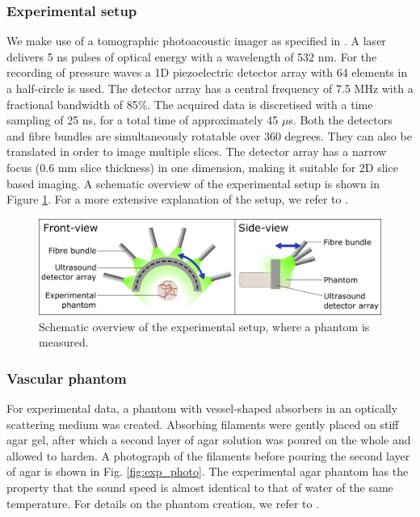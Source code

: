 \documentclass[journal]{IEEEtran}
\newcommand{\hl}[1]{#1}
\begin{document}
\subsubsection{Experimental setup}
We make use of a tomographic photoacoustic imager as specified in \cite{Es2015}. A laser delivers 5 ns pulses of optical energy with a wavelength of 532 nm. For the recording of pressure waves a 1D piezoelectric detector array with 64 elements in a half-circle is used. The detector array has a central frequency of 7.5 MHz with a fractional bandwidth of 85\%. \hl{The acquired data is discretised with a time sampling of 25 ns, for a total time of approximately 45 $\mu$s.} Both the detectors and fibre bundles are simultaneously rotatable over 360 degrees. They can also be translated in order to image multiple slices. The detector array has a narrow focus (0.6 mm slice thickness) in one dimension, making it suitable for 2D slice based imaging. A schematic overview of the experimental setup is shown in Figure \ref{fig:exp_setup}. For a more extensive explanation of the setup, we refer to \cite{Es2015}. 

\begin{figure}[!ht]
\centering
\includegraphics[width=\linewidth]{images/Experimental_setup4.png}
\caption{Schematic overview of the experimental setup, where a phantom is measured.}
\label{fig:exp_setup}
\vspace{-5mm}
\end{figure}

\subsubsection{Vascular phantom}
For experimental data, a phantom with vessel-shaped absorbers in an optically scattering medium was created. Absorbing filaments were gently placed on stiff agar gel, after which a second layer of agar solution was poured on the whole and allowed to harden. A photograph of the filaments before pouring the second layer of agar is shown in Fig. \ref{fig:exp_photo}. {The experimental agar phantom has the property that the sound speed is almost identical to that of water of the same temperature.} For details on the phantom creation, we refer to \cite{Boink2018}. 
\end{document}
